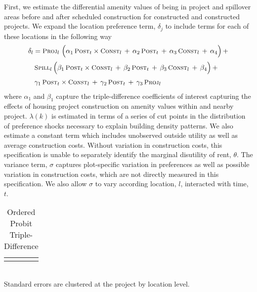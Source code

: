 \documentclass[12pt]{article}
\begin{document}
First, we estimate the differential amenity values of being in project and spillover areas before and after scheduled construction for constructed and constructed projects.  We expand the location preference term, $\delta_j$ to include terms for each of these locations in the following way
\begin{align*}
\delta_l &= \textsc{\small Proj}_{l} \,\, \Big( \alpha_1 \, \textsc{\small Post}_{t}\times\textsc{\small Const}_{l} \, + \, \alpha_2 \, \textsc{\small Post}_{t} \, + \, \alpha_3 \, \textsc{\small Const}_{l}\, +\, \alpha_4 \Big) \, + \\[.2em]
& \, \textsc{\small Spill}_{l} \, \Big( \beta_1 \, \textsc{\small Post}_{t}\times\textsc{\small Const}_{l} \, + \, \beta_2 \, \textsc{\small Post}_{t} \, + \, \beta_3 \, \textsc{\small Const}_{l} \, +\, \beta_4 \Big) \, + \\[.2em]
& \, \gamma_1 \,  \textsc{\small Post}_{t}\times\textsc{\small Const}_{l} \, + \, \gamma_2 \,\textsc{\small Post}_{t} \, + \, \gamma_3 \,  \textsc{\small Proj}_{l}
\end{align*}
\noindent where $\alpha_1$ and $\beta_1$ capture the triple-difference coefficients of interest capturing the effects of housing project construction on amenity values within and nearby project.  $\lambda(k)$ is estimated in terms of a series of cut points in the distribution of preference shocks necessary to explain building density patterns.  We also estimate a constant term which includes unobserved outside utility as well as average construction costs.  Without variation in construction costs, this specification is unable to separately identify the marginal disutility of rent, $\theta$.  The variance term, $\sigma$ captures plot-specific variation in preferences as well as possible variation in construction costs, which are not directly measured in this specification.  We also allow $\sigma$ to vary according location, $l$, interacted with time, $t$.  


\begin{table}[h]
\centering
\caption{Ordered Probit Triple-Difference}\label{table:mainestfull_output}
\vspace{-2mm}
\begin{tabular}{lDD}
\toprule

% 

\bottomrule\\[-.6em]
\end{tabular}\\
Standard errors are clustered at the project by location level.  
\end{table}
\end{document}
